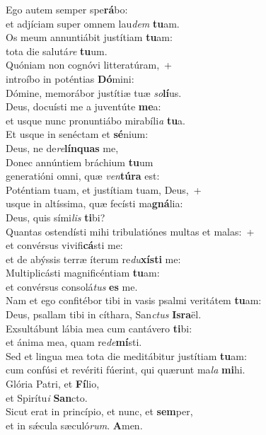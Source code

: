 \evenverse Ego autem semper spe\textbf{rá}bo:~\*\\
\evenverse et adjíciam super omnem lau\textit{dem} \textbf{tu}am.\\
\oddverse Os meum annuntiábit justítiam \textbf{tu}am:~\*\\
\oddverse tota die salutá\textit{re} \textbf{tu}um.\\
\evenverse Quóniam non cognóvi litteratúram,~+\\
\evenverse  introíbo in poténtias \textbf{Dó}mini:~\*\\
\evenverse Dómine, memorábor justítiæ tuæ \textit{so}\textbf{lí}us.\\
\oddverse Deus, docuísti me a juventúte \textbf{me}a:~\*\\
\oddverse et usque nunc pronuntiábo mirabíli\textit{a} \textbf{tu}a.\\
\evenverse Et usque in senéctam et \textbf{sé}nium:~\*\\
\evenverse Deus, ne de\textit{re}\textbf{lín}\textbf{quas} me,\\
\oddverse Donec annúntiem bráchium \textbf{tu}um~\*\\
\oddverse generatióni omni, quæ \textit{ven}\textbf{tú}\textbf{ra} est:\\
\evenverse Poténtiam tuam, et justítiam tuam, Deus,~+\\
\evenverse  usque in altíssima, quæ fecísti ma\textbf{gná}lia:~\*\\
\evenverse Deus, quis sími\textit{lis} \textbf{ti}bi?\\
\oddverse Quantas ostendísti mihi tribulatiónes multas et malas:~+\\
\oddverse  et convérsus vivifi\textbf{cá}sti me:~\*\\
\oddverse et de abýssis terræ íterum re\textit{du}\textbf{xí}\textbf{sti} me:\\
\evenverse Multiplicásti magnificéntiam \textbf{tu}am:~\*\\
\evenverse et convérsus consolá\textit{tus} \textbf{es} me.\\
\oddverse Nam et ego confitébor tibi in vasis psalmi veritátem \textbf{tu}am:~\*\\
\oddverse Deus, psallam tibi in cíthara, San\textit{ctus} \textbf{Is}\textbf{ra}ël.\\
\evenverse Exsultábunt lábia mea cum cantávero \textbf{ti}bi:~\*\\
\evenverse et ánima mea, quam re\textit{de}\textbf{mí}sti.\\
\oddverse Sed et lingua mea tota die meditábitur justítiam \textbf{tu}am:~\*\\
\oddverse cum confúsi et revériti fúerint, qui quærunt ma\textit{la} \textbf{mi}hi.\\
\evenverse Glória Patri, et \textbf{Fí}lio,~\*\\
\evenverse et Spirítu\textit{i} \textbf{San}cto.\\
\oddverse Sicut erat in princípio, et nunc, et \textbf{sem}per,~\*\\
\oddverse et in sǽcula sæculó\textit{rum}. \textbf{A}men.\\
